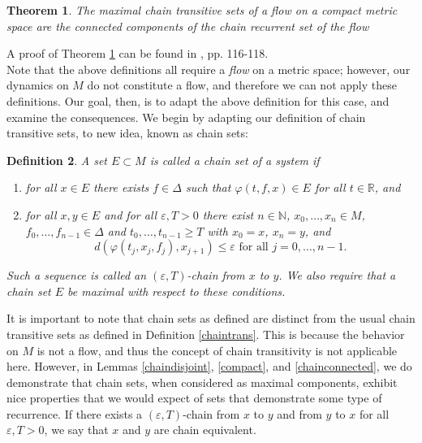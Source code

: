 \documentclass[11pt]{article}
\newtheorem{thm}{Theorem}
\newtheorem{defn}[thm]{Definition}
\begin{document}
\begin{thm}\label{chaincom}
The maximal chain transitive sets of a flow on a compact metric space are the connected components of the chain recurrent set of the flow
\end{thm}
\noindent A proof of Theorem \ref{chaincom} can be found in \cite{Alongi}, pp. 116-118.\\

\indent Note that the above definitions all require a \emph{flow} on a metric space; however, our dynamics on $M$ do not constitute a flow, and therefore we can not apply these definitions.  Our goal, then, is to adapt the above definition for this case, and examine the consequences.  We begin by adapting our definition of chain transitive sets, to new idea, known as chain sets:


\begin{defn} \label{chain set} A set $E\subset M$ is called a chain set of a system if 

\begin{enumerate}
\item for all $x\in E$ there exists $f\in\Delta$ such that $\varphi(t,f,x)\in E$ for all $t\in\mathbb{R}$, and\\
\item for all $x,y\in E$ and for all $\varepsilon,T>0$ there exist $n\in\mathbb{N}$, $x_0,\ldots,x_n\in M$, $f_0,\ldots,f_{n-1}\in\Delta$ and $t_0,\ldots,t_{n-1}\geq T$ with $x_0=x$, $x_n=y$, and 
$$d(\varphi(t_j,x_j,f_j),x_{j+1})\leq\varepsilon\mbox{ for all }j=0,\ldots,n-1.$$
\end{enumerate}
Such a sequence is called an $(\varepsilon,T)$-chain from $x$ to $y$. We also require that a chain set $E$ be maximal with respect to these conditions.
\end{defn}

\indent It is important to note that chain sets as defined are distinct from the usual chain transitive sets as defined in Definition \ref{chaintrans}.  This is because the behavior on $M$ is not a flow, and thus the concept of chain transitivity is not applicable here.  However, in Lemmas \ref{chaindisjoint}, \ref{compact},  and \ref{chainconnected}, we do demonstrate that chain sets, when considered as maximal components, exhibit nice properties that we would expect of sets that demonstrate some type of recurrence.   If there exists a $(\varepsilon,T)$-chain from $x$ to $y$ and from $y$ to $x$ for all $\varepsilon, T>0$, we say that $x$ and $y$ are chain equivalent.\\
\end{document}
